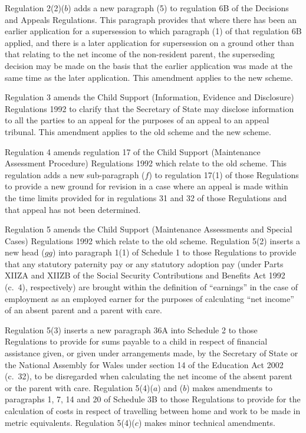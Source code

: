 \documentclass[12pt,a4paper]{article}
\begin{document}
Regulation 2(2)($b$)  adds a new paragraph (5) to regulation 6B of the Decisions and Appeals Regulations. This paragraph provides that where there has been an earlier application for a supersession to which paragraph (1) of that regulation 6B applied, and there is a later application for supersession on a ground other than that relating to the net income of the non-resident parent, the superseding decision may be made on the basis that the earlier application was made at the same time as the later application. This amendment applies to the new scheme.

Regulation 3 amends the Child Support (Information, Evidence and Disclosure) Regulations 1992 to clarify that the Secretary of State may disclose information to all the parties to an appeal for the purposes of an appeal to an appeal tribunal. This amendment applies to the old scheme and the new scheme.

Regulation 4 amends regulation 17 of the Child Support (Maintenance Assessment Procedure) Regulations 1992 which relate to the old scheme. This regulation adds a new sub-paragraph ($f$)  to regulation 17(1) of those Regulations to provide a new ground for revision in a case where an appeal is made within the time limits provided for in regulations 31 and 32 of those Regulations and that appeal has not been determined.

Regulation 5 amends the Child Support (Maintenance Assessments and Special Cases) Regulations 1992 which relate to the old scheme. Regulation 5(2) inserts a new head ($gg$)  into paragraph 1(1) of Schedule 1 to those Regulations to provide that any statutory paternity pay or any statutory adoption pay (under Parts XIIZA and XIIZB of the Social Security Contributions and Benefits Act 1992 (c.\ 4), respectively) are brought within the definition of “earnings” in the case of employment as an employed earner for the purposes of calculating “net income” of an absent parent and a parent with care.

Regulation 5(3) inserts a new paragraph 36A into Schedule 2 to those Regulations to provide for sums payable to a child in respect of financial assistance given, or given under arrangements made, by the Secretary of State or the National Assembly for Wales under section 14 of the Education Act 2002 (c.\ 32), to be disregarded when calculating the net income of the absent parent or the parent with care. Regulation 5(4)($a$)  and ($b$)  makes amendments to paragraphs 1, 7, 14 and 20 of Schedule 3B to those Regulations to provide for the calculation of costs in respect of travelling between home and work to be made in metric equivalents. Regulation 5(4)($c$)  makes minor technical amendments.
\end{document}
